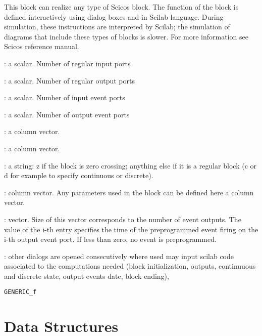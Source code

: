 \label{scifuncblock}

This block can realize any type of Scicos block. The function of the
block is defined interactively using dialog boxes and in Scilab
language. During simulation, these instructions are interpreted by
Scilab; the simulation of diagrams that include these types of blocks 
is slower. For more information see Scicos reference manual.
\begin{scitem}
\item[{\verb?number of inputs?}]
: a scalar. Number of regular input ports
\item[{\verb?number of outputs?}]
: a scalar. Number of regular output ports
\item[{\verb?number of input events?}]
: a scalar. Number of input event ports
\item[{\verb?number of output events?}]
: a scalar. Number of output event ports
\item[{\verb?Initial continuous state?}]
: a column vector.
\item[{\verb?Initial discrete state?}]
: a column vector.
\item[{\verb?System type?}]
: a string: z if the block is zero crossing; anything else if it is
a regular block (c or d for example to specify continuous or discrete). 
\item[{\verb?System parameter?}]
: column vector. Any parameters used in the block can be defined here
a column vector.
\item[{\verb?initial firing?}]
: vector. Size of this vector corresponds to the number of event
outputs. The value of the i-th entry specifies the time of the
preprogrammed event firing on the i-th output event port. If less than
zero, no event is preprogrammed.

\item[{\verb?Instructions?}]
: other dialogs are opened consecutively where used may input scilab
code associated to the computations needed (block initialization,
outputs, continuuous and 
discrete state, output events date, block ending),

\end{scitem}%
{\verb?GENERIC_f?} \pageref{GENERICf}





\section{Data Structures}


